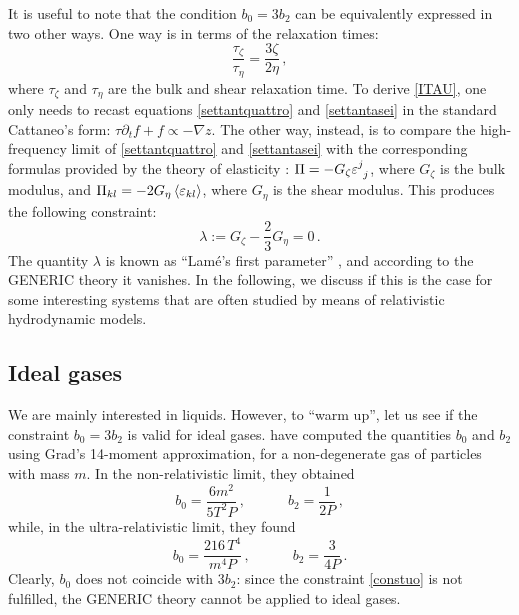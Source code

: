 \documentclass[a4paper, amsfonts, amssymb, amsmath, reprint, showkeys, nofootinbib, twoside, onecolumn, notitlepage]{revtex4-1}
\newcommand{\spc}{\quad \quad \quad}
\theoremstyle{definition}
\theoremstyle{theorem}
\begin{document}
It is useful to note that the condition $b_0=3b_2$ can be equivalently expressed in two other ways. One way is in terms of the relaxation times:
\begin{equation}
\label{ITAU}
\dfrac{\tau_\zeta}{\tau_\eta} = \dfrac{3\zeta}{2\eta} \, ,
\end{equation}
where $\tau_\zeta$ and $\tau_\eta$ are the bulk and shear relaxation time. To derive \eqref{ITAU}, one only needs to recast equations \eqref{settantquattro} and \eqref{settantasei} in the standard Cattaneo's \cite{cattaneo1958} form: $\tau \partial_t f+f \propto -\nabla z$. The other way, instead, is to compare the high-frequency limit of \eqref{settantquattro} and \eqref{settantasei} with the corresponding formulas provided by the theory of elasticity \cite{landau7}: $\Pi=-G_\zeta \varepsilon\indices{^j _j}$, where $G_\zeta$ is the bulk modulus, and $\Pi_{kl}=-2G_\eta \braket{\varepsilon_{kl}}$, where $G_\eta$ is the shear modulus. This produces the following constraint:
\begin{equation}
\lambda := G_\zeta - \dfrac{2}{3}G_\eta =0 \, .
\end{equation}
The quantity $\lambda$ is known as ``Lam\'{e}'s first parameter'' \cite{landau7}, and according to the GENERIC theory it vanishes. 
In the following, we discuss if this is the case for some interesting systems that are often studied by means of relativistic hydrodynamic models.

\subsection{Ideal gases}

We are mainly interested in liquids. However, to ``warm up'', let us see if the constraint $b_0=3b_2$ is valid for ideal gases. \citet{Israel_Stewart_1979} have computed the quantities $b_0$ and $b_2$ using Grad's 14-moment approximation, for a non-degenerate gas of particles with mass $m$. In the non-relativistic limit, they obtained
\begin{equation}
b_0 = \dfrac{6m^2}{5 T^2 P} \, , \spc b_2 = \dfrac{1}{2P} \, , 
\end{equation}
while, in the ultra-relativistic limit, they found
\begin{equation}
b_0 = \dfrac{216 \, T^4}{ m^4 P} \, , \spc  b_2 = \dfrac{3}{4P} \, . 
\end{equation}
Clearly, $b_0$ does not coincide with $3b_2$: since the constraint \eqref{constuo} is not fulfilled, the GENERIC theory cannot be applied to ideal gases.
\end{document}
